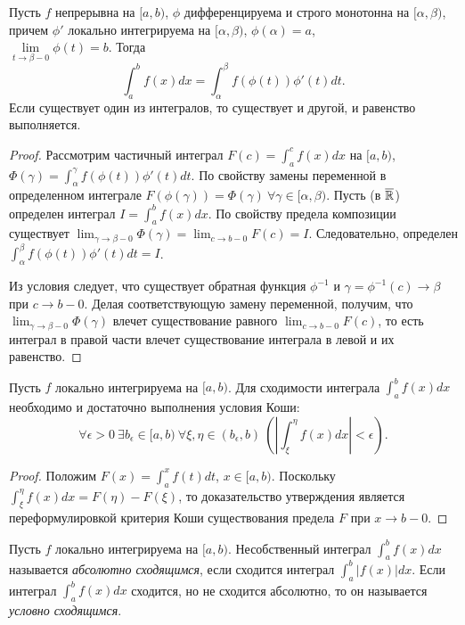 \begin{property}
    Пусть $f$ непрерывна на $[a, b)$, $\phi$ дифференцируема и строго монотонна на $[\alpha, \beta)$, причем $\phi'$ локально интегрируема на $[\alpha, \beta)$, $\phi(\alpha) = a$, \\
    $\underset{t \to \beta - 0}{\lim}\phi(t)= b$. Тогда
    \[
        \int_{a}^{b} f(x) dx = \int_{\alpha}^{\beta} f(\phi(t)) \phi'(t) dt.
    \]
    Если существует один из интегралов, то существует и другой, и равенство выполняется.
\end{property}

\begin{proof}
    Рассмотрим частичный интеграл $F(c) = \int_{a}^{c} f(x) dx$ на $[a, b)$, $\Phi(\gamma) = \int_{\alpha}^{\gamma} f(\phi(t)) \phi'(t) dt$. По свойству замены переменной в определенном интеграле $F(\phi(\gamma)) = \Phi(\gamma) \ \forall \gamma \in [\alpha, \beta)$. Пусть (в $\overline{\mathbb{R}}$) определен интеграл $I = \int_{a}^{b} f(x) dx$. По свойству предела композиции существует $\lim_{\gamma \to \beta - 0} \Phi(\gamma) = \lim_{c \to b - 0} F(c) = I$. Следовательно, определен $\int_{\alpha}^{\beta} f(\phi(t)) \phi'(t) dt = I$.
    
    Из условия следует, что существует обратная функция $\phi^{-1}$ и $\gamma = \phi^{-1}(c) \to \beta$ при $c \to b - 0$. Делая соответствующую замену переменной, получим, что $\lim_{\gamma \to \beta - 0} \Phi(\gamma)$ влечет существование равного $\lim_{c \to b - 0} F(c)$, то есть интеграл в правой части влечет существование интеграла в левой и их равенство.
\end{proof}

\begin{theorem}
    Пусть $f$ локально интегрируема на $[a, b)$. Для сходимости интеграла $\int_{a}^{b} f(x) dx$ необходимо и достаточно выполнения условия Коши:
    \[
        \forall \epsilon > 0 \ \exists b_{\epsilon} \in [a, b) \ \forall \xi, \eta \in (b_{\epsilon}, b) \ \left(\left|\int_{\xi}^{\eta} f(x) dx \right| < \epsilon\right).
    \]
\end{theorem}

\begin{proof}
    Положим $F(x) = \int_{a}^{x} f(t) dt$, $x \in [a, b)$. Поскольку $\int_{\xi}^{\eta} f(x) dx = F(\eta) - F(\xi)$, то доказательство утверждения является переформулировкой критерия Коши существования предела $F$ при $x \to b - 0$.
\end{proof}

\begin{definition}
    Пусть $f$ локально интегрируема на $[a, b)$. Несобственный интеграл $\int_{a}^{b} f(x) dx$ называется \textit{абсолютно сходящимся}, если сходится интеграл $\int_{a}^{b} |f(x)| dx$. Если интеграл $\int_{a}^{b} f(x) dx$ сходится, но не сходится абсолютно, то он называется \textit{условно сходящимся}.
\end{definition}

